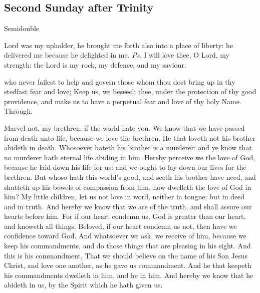 \clearpage
\subsection{Second Sunday after Trinity}
\begin{inhead}
    {Semidouble}
\end{inhead}


\introit
{} Lord was my upholder, he brought me forth also into a place of liberty: he delivered me because he delighted in me. \textit{Ps.} I will love thee, O Lord, my strength: the Lord is my rock, my defence, and my saviour.

\collect
{} who never failest to help and govern those whom thou dost bring up in thy stedfast fear and love; Keep us, we beseech thee, under the protection of thy good providence, and make us to have a perpetual fear and love of thy holy Name. Through.

 Marvel not, my brethren, if the world hate you. We know that we have passed from death unto life, because we love the brethren. He that loveth not his brother abideth in death. Whosoever hateth his brother is a murderer: and ye know that no murderer hath eternal life abiding in him. Hereby perceive we the love of God, because he laid down his life for us: and we ought to lay down our lives for the brethren. But whoso hath this world's good, and seeth his brother have need, and shutteth up his bowels of compassion from him, how dwelleth the love of God in him? My little children, let us not love in word, neither in tongue; but in deed and in truth. And hereby we know that we are of the truth, and shall assure our hearts before him. For if our heart condemn us, God is greater than our heart, and knoweth all things. Beloved, if our heart condemn us not, then have we confidence toward God. And whatsoever we ask, we receive of him, because we keep his commandments, and do those things that are pleasing in his sight. And this is his commandment, That we should believe on the name of his Son Jesus Christ, and love one another, as he gave us commandment. And he that keepeth his commandments dwelleth in him, and he in him. And hereby we know that he abideth in us, by the Spirit which he hath given us.


